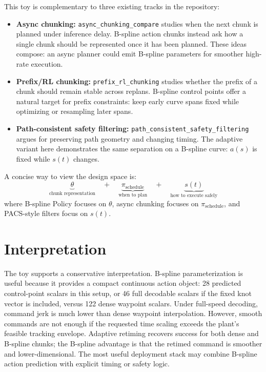 \documentclass[11pt]{article}
\begin{document}
This toy is complementary to three existing tracks in the repository:
\begin{itemize}[leftmargin=1.5em]
  \item \textbf{Async chunking:} \texttt{async\_chunking\_compare} studies when the next chunk is planned under inference delay. B-spline action chunks instead ask how a single chunk should be represented once it has been planned. These ideas compose: an async planner could emit B-spline parameters for smoother high-rate execution.
  \item \textbf{Prefix/RL chunking:} \texttt{prefix\_rl\_chunking} studies whether the prefix of a chunk should remain stable across replans. B-spline control points offer a natural target for prefix constraints: keep early curve spans fixed while optimizing or resampling later spans.
  \item \textbf{Path-consistent safety filtering:} \texttt{path\_consistent\_safety\_filtering} argues for preserving path geometry and changing timing. The adaptive variant here demonstrates the same separation on a B-spline curve: \(a(s)\) is fixed while \(s(t)\) changes.
\end{itemize}

A concise way to view the design space is:
\[
  \underbrace{\theta}_{\text{chunk representation}} \quad + \quad
  \underbrace{\pi_{\mathrm{schedule}}}_{\text{when to plan}} \quad + \quad
  \underbrace{s(t)}_{\text{how to execute safely}}
\]
where B-spline Policy focuses on \(\theta\), async chunking focuses on \(\pi_{\mathrm{schedule}}\), and PACS-style filters focus on \(s(t)\).

\section{Interpretation}

The toy supports a conservative interpretation. B-spline parameterization is useful because it provides a compact continuous action object: 28 predicted control-point scalars in this setup, or 46 full decodable scalars if the fixed knot vector is included, versus 122 dense waypoint scalars. Under full-speed decoding, command jerk is much lower than dense waypoint interpolation. However, smooth commands are not enough if the requested time scaling exceeds the plant's feasible tracking envelope. Adaptive retiming recovers success for both dense and B-spline chunks; the B-spline advantage is that the retimed command is smoother and lower-dimensional. The most useful deployment stack may combine B-spline action prediction with explicit timing or safety logic.
\end{document}
